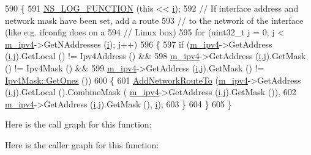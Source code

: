 \begin{DoxyCode}
590 \{
591   \hyperlink{log-macros-disabled_8h_a90b90d5bad1f39cb1b64923ea94c0761}{NS\_LOG\_FUNCTION} (\textcolor{keyword}{this} << \hyperlink{bernuolliDistribution_8m_a6f6ccfcf58b31cb6412107d9d5281426}{i});
592   \textcolor{comment}{// If interface address and network mask have been set, add a route}
593   \textcolor{comment}{// to the network of the interface (like e.g. ifconfig does on a}
594   \textcolor{comment}{// Linux box)}
595   \textcolor{keywordflow}{for} (uint32\_t j = 0; j < \hyperlink{classns3_1_1Ipv4StaticRouting_adc30356be1824ea40ffbd444a5d91b9f}{m\_ipv4}->GetNAddresses (\hyperlink{bernuolliDistribution_8m_a6f6ccfcf58b31cb6412107d9d5281426}{i}); j++)
596     \{
597       \textcolor{keywordflow}{if} (\hyperlink{classns3_1_1Ipv4StaticRouting_adc30356be1824ea40ffbd444a5d91b9f}{m\_ipv4}->GetAddress (\hyperlink{bernuolliDistribution_8m_a6f6ccfcf58b31cb6412107d9d5281426}{i},j).GetLocal () != Ipv4Address () &&
598           \hyperlink{classns3_1_1Ipv4StaticRouting_adc30356be1824ea40ffbd444a5d91b9f}{m\_ipv4}->GetAddress (\hyperlink{bernuolliDistribution_8m_a6f6ccfcf58b31cb6412107d9d5281426}{i},j).GetMask () != Ipv4Mask () &&
599           \hyperlink{classns3_1_1Ipv4StaticRouting_adc30356be1824ea40ffbd444a5d91b9f}{m\_ipv4}->GetAddress (\hyperlink{bernuolliDistribution_8m_a6f6ccfcf58b31cb6412107d9d5281426}{i},j).GetMask () != \hyperlink{classns3_1_1Ipv4Mask_af712cbdf28c039025d4aa45fa7e243dd}{Ipv4Mask::GetOnes} ())
600         \{
601           \hyperlink{classns3_1_1Ipv4StaticRouting_a8bf5eaa7ba49fe33c78c70d5560b6c39}{AddNetworkRouteTo} (\hyperlink{classns3_1_1Ipv4StaticRouting_adc30356be1824ea40ffbd444a5d91b9f}{m\_ipv4}->GetAddress (\hyperlink{bernuolliDistribution_8m_a6f6ccfcf58b31cb6412107d9d5281426}{i},j).GetLocal ().CombineMask (
      \hyperlink{classns3_1_1Ipv4StaticRouting_adc30356be1824ea40ffbd444a5d91b9f}{m\_ipv4}->GetAddress (\hyperlink{bernuolliDistribution_8m_a6f6ccfcf58b31cb6412107d9d5281426}{i},j).GetMask ()),
602                              \hyperlink{classns3_1_1Ipv4StaticRouting_adc30356be1824ea40ffbd444a5d91b9f}{m\_ipv4}->GetAddress (\hyperlink{bernuolliDistribution_8m_a6f6ccfcf58b31cb6412107d9d5281426}{i},j).GetMask (), \hyperlink{bernuolliDistribution_8m_a6f6ccfcf58b31cb6412107d9d5281426}{i});
603         \}
604     \}
605 \}
\end{DoxyCode}


Here is the call graph for this function\+:




Here is the caller graph for this function\+:


